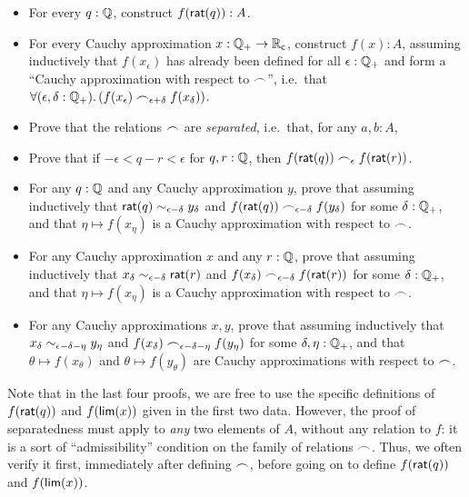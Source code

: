 \begin{itemize}
\item For every $q : \mathbb{Q}$, construct $f(\mathsf{rat}(q)) : A$.
\item For every Cauchy approximation $x : \mathbb{Q}_{+} \to \mathbb{R}_\mathsf{c}$, construct $f(x) : A$, assuming inductively that $f(x_\epsilon)$ has already been defined for all $\epsilon : \mathbb{Q}_{+}$ and form a ``Cauchy approximation with respect to $\frown$'', i.e.\ that $\fall{\epsilon,\delta:\Qp} (f(x_\epsilon) \bsim_{\epsilon+\delta} f(x_\delta))$.
\item Prove that the relations $\frown$ are \emph{separated}, i.e.\ that, for any $a,b:A$,
\item Prove that if $-\epsilon< q-r <\epsilon$ for $q,r:\mathbb{Q}$, then $f(\mathsf{rat}(q))\frown_\epsilon f(\mathsf{rat}(r))$.
\item For any $q:\mathbb{Q}$ and any Cauchy approximation $y$, prove that
 assuming inductively that $\mathsf{rat}(q)\sim_{\epsilon-\delta} y_\delta$ and $f(\mathsf{rat}(q)) \frown_{\epsilon-\delta} f(y_\delta)$ for some $\delta:\mathbb{Q}_{+}$, and that $\eta \mapsto f(x_\eta)$ is a Cauchy approximation with respect to $\frown$.
\item For any Cauchy approximation $x$ and any $r:\mathbb{Q}$, prove that
assuming inductively that $x_\delta \sim_{\epsilon-\delta} \mathsf{rat}(r)$ and $f(x_\delta) \frown_{\epsilon-\delta} f(\mathsf{rat}(r))$ for some $\delta:\mathbb{Q}_{+}$, and that $\eta\mapsto f(x_\eta)$ is a Cauchy approximation with respect to $\frown$.
\item For any Cauchy approximations $x,y$, prove that
assuming inductively that $x_\delta \sim_{\epsilon-\delta-\eta} y_\eta$ and $f(x_\delta) \frown_{\epsilon-\delta-\eta} f(y_\eta)$ for some $\delta,\eta:\mathbb{Q}_{+}$, and that $\theta\mapsto f(x_\theta)$ and $\theta\mapsto f(y_\theta)$ are Cauchy approximations with respect to $\frown$.
\end{itemize}
Note that in the last four proofs, we are free to use the specific definitions of $f(\mathsf{rat}(q))$ and $f(\mathsf{lim}(x))$ given in the first two data.
However, the proof of separatedness must apply to \emph{any} two elements of $A$, without any relation to $f$: it is a sort of ``admissibility'' condition on the family of relations $\frown$.
Thus, we often verify it first, immediately after defining $\frown$, before going on to define $f(\mathsf{rat}(q))$ and $f(\mathsf{lim}(x))$.


